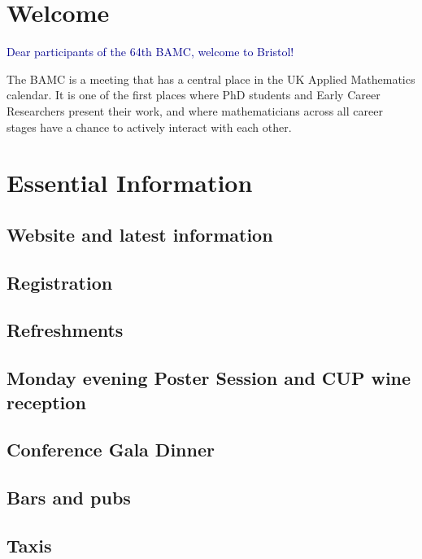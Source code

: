 \documentclass[12pt,a4paper]{article}
\begin{document}

\setcounter{page}{1}

\section{Welcome}

\textcolor{DarkBlue}{\large Dear participants of the 64th BAMC, welcome to Bristol!}

The BAMC is a meeting that has a central place in the UK Applied Mathematics calendar. It is one of the first places where PhD students and Early Career Researchers present their work, and where mathematicians across all career stages have a chance to actively interact with each other.

\section{Essential Information}

\subsection{Website and latest information}

\subsection{Registration}

\subsection{Refreshments}

\subsection{Monday evening Poster Session and CUP wine reception}

\subsection{Conference Gala Dinner}

\subsection{Bars and pubs}

\subsection{Taxis}
\end{document}
